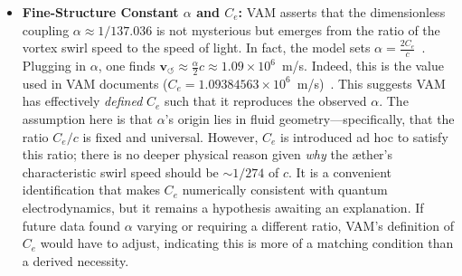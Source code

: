 \documentclass[a4paper,12pt]{article}
\begin{document}
\begin{itemize}
        \item \textbf{Fine-Structure Constant $\alpha$ and $C_e$:} VAM asserts that the dimensionless coupling $\alpha \approx 1/137.036$ is not mysterious but emerges from the ratio of the vortex swirl speed to the speed of light. In fact, the model sets $\alpha = \frac{2C_e}{c}$~\cite{vamalpha}. Plugging in $\alpha$, one finds $\mathbf{v}_{\scriptscriptstyle\boldsymbol{\circlearrowleft}} \approx \frac{\alpha}{2}c \approx 1.09\times10^6$~m/s. Indeed, this is the value used in VAM documents ($C_e=1.09384563\times10^6$~m/s)~\cite{vamunits}. This suggests VAM has effectively \emph{defined} $C_e$ such that it reproduces the observed $\alpha$. The assumption here is that $\alpha$’s origin lies in fluid geometry---specifically, that the ratio $C_e/c$ is fixed and universal. However, $C_e$ is introduced ad hoc to satisfy this ratio; there is no deeper physical reason given \emph{why} the æther’s characteristic swirl speed should be $\sim 1/274$ of $c$. It is a convenient identification that makes $C_e$ numerically consistent with quantum electrodynamics, but it remains a hypothesis awaiting an explanation. If future data found $\alpha$ varying or requiring a different ratio, VAM’s definition of $C_e$ would have to adjust, indicating this is more of a matching condition than a derived necessity.






\end{itemize}
\end{document}

